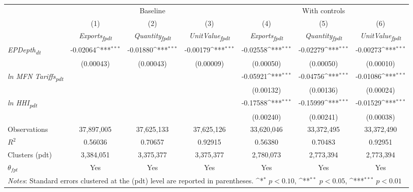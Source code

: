 {
\def\sym#1{\ifmmode^{#1}\else\(^{#1}\)\fi}
\begin{tabular}{l*{6}{c}}
\toprule
&\multicolumn{3}{c}{Baseline}&\multicolumn{3}{c}{With controls}\\\cmidrule(lr){2-4}\cmidrule(lr){5-7}
&(1)&(2)&(3)&(4)&(5)&(6)\\
&\textit{Exports\textsubscript{fpdt}}&\textit{Quantity\textsubscript{fpdt}}&\textit{UnitValue\textsubscript{fpdt}}&\textit{Exports\textsubscript{fpdt}}&\textit{Quantity\textsubscript{fpdt}}&\textit{UnitValue\textsubscript{fpdt}}\\
\midrule
\textit{EPDepth\textsubscript{dt}} & -0.02064\sym{***} & -0.01880\sym{***} & -0.00179\sym{***} & -0.02558\sym{***} & -0.02279\sym{***} & -0.00273\sym{***}\\
 & (0.00043) & (0.00043) & (0.00009) & (0.00050) & (0.00050) & (0.00010)\\
\addlinespace
\textit{ln MFN Tariffs\textsubscript{pdt}} &  &  &  & -0.05921\sym{***} & -0.04756\sym{***} & -0.01086\sym{***}\\
 &  &  &  & (0.00132) & (0.00136) & (0.00024)\\
\addlinespace
\textit{ln HHI\textsubscript{pdt}} &  &  &  & -0.17588\sym{***} & -0.15999\sym{***} & -0.01529\sym{***}\\
 &  &  &  & (0.00240) & (0.00241) & (0.00038)\\
\midrule
Observations & 37,897,005 & 37,625,133 & 37,625,126 & 33,620,046 & 33,372,495 & 33,372,490\\
$R^{2}$ & 0.56036 & 0.70657 & 0.92915 & 0.56380 & 0.70483 & 0.92951\\
Clusters (pdt) & 3,384,051 & 3,375,377 & 3,375,377 & 2,780,073 & 2,773,394 & 2,773,394\\
$\theta_{fpt}$ & Yes & Yes & Yes & Yes & Yes & Yes\\
\bottomrule
\multicolumn{7}{l}{\footnotesize \textit{Notes}: Standard errors clustered at the (pdt) level are reported in parentheses. \sym{*} \(p<0.10\), \sym{**} \(p<0.05\), \sym{***} \(p<0.01\)}\\
\end{tabular}
}
